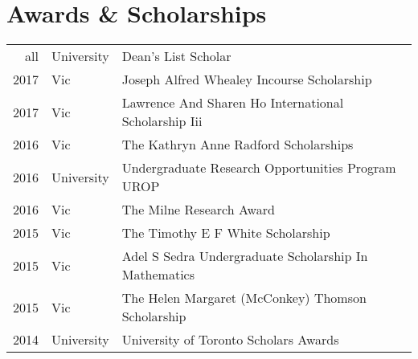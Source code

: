 \documentclass[]{deedy-resume-openfont}
\begin{document}
\begin{minipage}[t]{0.66\textwidth}
    \section{Awards \& Scholarships} 
    \begin{small}
        \begin{tabular}{rll}
            all      	 & University  & Dean’s List Scholar \\
            2017         & Vic         & Joseph Alfred Whealey Incourse Scholarship  \\ 
            2017         & Vic         & Lawrence And Sharen Ho International Scholarship Iii  \\ 
            2016 		 & Vic		   & The Kathryn Anne Radford Scholarships \\
            2016	     & University  & Undergraduate Research Opportunities Program UROP \\ 
            2016	     & Vic  	   & The Milne Research Award \\
            2015 		 & Vic 		   & The Timothy E F White Scholarship \\ 
            2015         & Vic         & Adel S Sedra Undergraduate Scholarship In Mathematics \\
            2015	     & Vic         & The Helen Margaret (McConkey) Thomson Scholarship  \\ 
            2014 		 & University  & University of Toronto Scholars Awards\\
            \end{tabular}
    \end{small}
    \sectionsep
    
    
    \end{minipage} 
    
\end{document}
